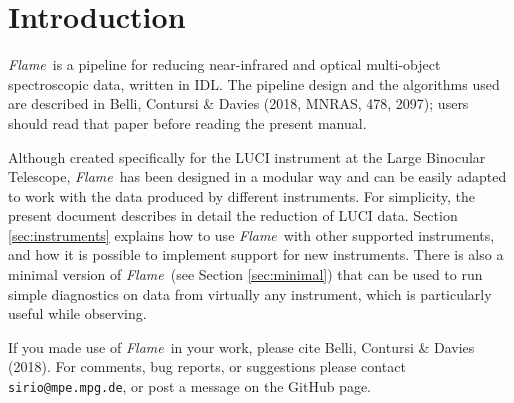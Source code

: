 \documentclass[a4paper]{article}
\newcommand{\flame}{\emph{Flame}}
\begin{document}
\begin{sloppypar}


\newpage
\section{Introduction}
\label{sec:introduction}

\flame\ is a pipeline for reducing near-infrared and optical multi-object spectroscopic data, written in IDL. The pipeline design and the algorithms used are described in Belli, Contursi \& Davies (2018, MNRAS, 478, 2097); users should read that paper before reading the present manual.

Although created specifically for the LUCI instrument at the Large Binocular Telescope, \flame\ has been designed in a modular way and can be easily adapted to work with the data produced by different instruments. For simplicity, the present document describes in detail the reduction of LUCI data. Section \ref{sec:instruments} explains how to use \flame\ with other supported instruments, and how it is possible to implement support for new instruments. There is also a minimal version of \flame\ (see Section \ref{sec:minimal}) that can be used to run simple diagnostics on data from virtually any instrument, which is particularly useful while observing.

If you made use of \flame\ in your work, please cite Belli, Contursi \& Davies (2018). For comments, bug reports, or suggestions please contact \texttt{sirio@mpe.mpg.de}, or post a message on the GitHub page.





\end{sloppypar}
\end{document}
